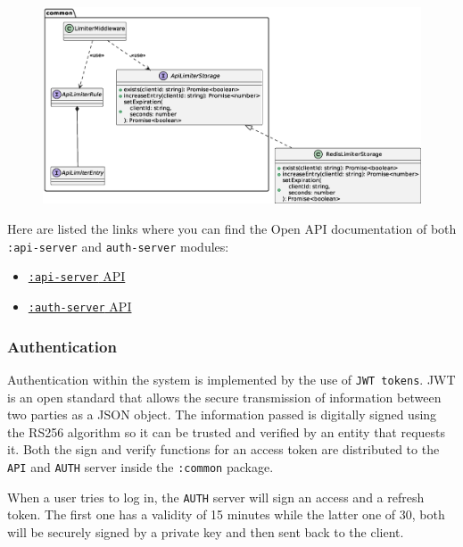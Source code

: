 \documentclass{scrartcl}
\begin{document}
\begin{figure}
    \centering
    \includegraphics[width=\linewidth]{figures/api-limiter-api.eps}
    \label{fig:api-limiter-api} 
\end{figure}

\begin{info}
    Here are listed the links where you can find the Open API documentation of both \texttt{:api-server} and \texttt{auth-server} modules:
    \begin{itemize}
        \item \href{https://tassiluca.github.io/ChainVote/swagger-ui-api/}{\texttt{:api-server} API}
        \item \href{https://tassiluca.github.io/ChainVote/swagger-ui-auth/}{\texttt{:auth-server} API}
    \end{itemize}
\end{info}

\fi

\subsubsection{Authentication}
Authentication within the system is implemented by the use of \texttt{JWT tokens}. JWT \cite{jwt} is an open standard that allows the secure transmission of information between two parties as a JSON object. The information passed is digitally signed using the RS256 algorithm so it can be trusted and verified by an entity that requests it. Both the sign and verify functions for an access token are distributed to the \texttt{API} and \texttt{AUTH} server inside the \texttt{:common} package.

When a user tries to log in, the \texttt{AUTH} server will sign an access and a refresh token. The first one has a validity of 15 minutes while the latter one of 30, both will be securely signed by a private key and then sent back to the client. 
\end{document}
